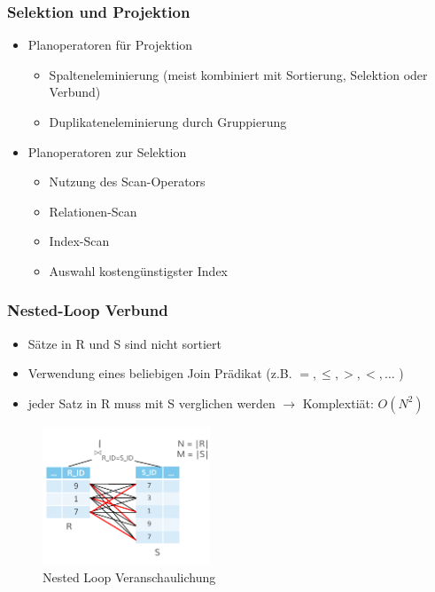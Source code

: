 \documentclass[a4paper]{article}
\begin{document}
    \subsubsection{Selektion und Projektion}
    \begin{itemize}
        \item Planoperatoren für Projektion
        \begin{itemize}
            \item Spalteneleminierung (meist kombiniert mit Sortierung, Selektion oder Verbund)
            \item Duplikateneleminierung durch Gruppierung
        \end{itemize}
        
        \item Planoperatoren zur Selektion
        \begin{itemize}
            \item Nutzung des Scan-Operators
            \item Relationen-Scan
            \item Index-Scan
            \item Auswahl kostengünstigster Index
        \end{itemize}
    \end{itemize}
    
    \subsubsection{Nested-Loop Verbund}
    \begin{itemize}
        \item Sätze in R und S sind nicht sortiert
        \item Verwendung eines beliebigen Join Prädikat (z.B. $= , \le , > , < , \dots$ )
        \item jeder Satz in R muss mit S verglichen werden $\to$ Komplextiät: $O(N^2)$
    \end{itemize}
    \begin{figure}[htp]
        \centering
        \includegraphics[width=5cm]{images/nestedLoop.png}
        \caption{Nested Loop Veranschaulichung}
        \label{fig:nestedLoop}
    \end{figure}
    
\end{document}
